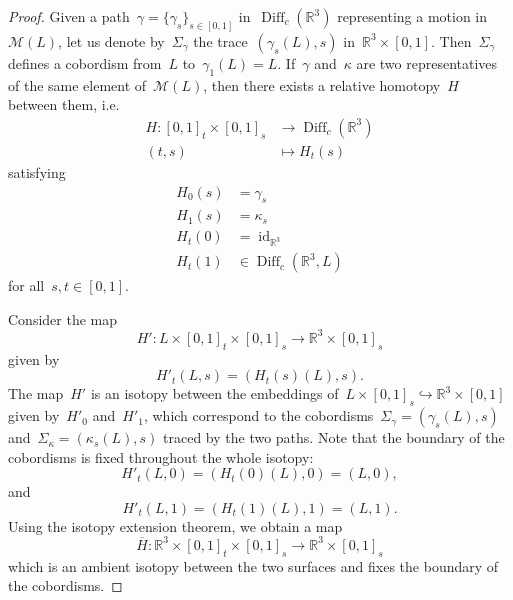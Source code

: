 \documentclass[10pt,a4paper]{amsart}
\newcommand{\R}{\mathbb{R}}
\newcommand{\calM}{\mathcal{M}}
\newcommand{\diff}{\operatorname{Diff}} %
\DeclareMathOperator{\id}{id}
\begin{document}
\begin{proof}
    Given a path~$\gamma = \{\gamma_s\}_{s\in[0,1]}$ in~$\diff_c(\R^3)$ representing a motion in~$\calM(L)$, let us denote by~$\Sigma_\gamma$ the trace~$(\gamma_s(L),s)$ in~$\R^3 \times [0,1]$. Then~$\Sigma_\gamma$ defines a cobordism from~$L$ to~$\gamma_1(L)=L$.
    If~$\gamma$ and~$\kappa$ are two representatives of the same element of~$\calM(L)$, then there exists a relative homotopy~$H$  between them, i.e.~\begin{align*}
        H \colon [0,1]_t \times [0,1]_s & \to \diff_c (\mathbb{R}^3)\\
         (t,s)  & \mapsto H_t(s)
    \end{align*}
    satisfying
    \begin{align*}
        H_0(s)&=\gamma_s\\
        H_1(s)&=\kappa_s\\
        H_t(0)&=\id_{\mathbb{R}^3}\\
        H_t(1)&\in \diff_c(\mathbb{R}^3,L)
    \end{align*}
    for all~$s, t\in[0,1]$.
    
    Consider the map~$$H' \colon L \times  [0,1]_t\times [0,1]_s \to \mathbb{R}^3 \times [0,1]_s$$
    given by 
    ~$$ H'_t(L,s) = (H_t(s)(L),s).$$
    The map~$H'$ is an isotopy between the embeddings of~$L \times [0,1]_s \hookrightarrow \mathbb{R}^3 \times [0,1]$ given by~$H'_0$ and~$H'_1$, which correspond to the cobordisms~$\Sigma_\gamma=(\gamma_s(L),s)$ and~$\Sigma_{\kappa}=(\kappa_s(L),s)$ traced by the two paths.
    Note that the boundary of the cobordisms is fixed throughout the whole isotopy:~$$H'_t(L,0)= (H_t(0)(L),0)=(L,0),$$
    and~$$ H'_t(L,1)=(H_t(1)(L),1)=(L,1).$$
    Using the isotopy extension theorem, we obtain a map~$$ \overline{H} \colon \mathbb{R}^3 \times [0,1]_t\times [0,1]_s \to \mathbb{R}^3 \times [0,1]_s$$ which is an ambient isotopy between the two surfaces and fixes the boundary of the cobordisms.     
\end{proof}
\end{document}
